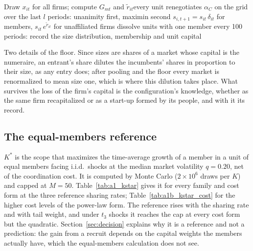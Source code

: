 \begin{algorithm}[H]
\caption{Order of events within a period}\label{alg:period}
\SetAlgoLined
Draw $x_{it}$ for all firms; compute $G_{mt}$ and $\tilde r_{it}$ every unit renegotiates $\alpha_C$ on the grid over the last $l$ periods: unanimity first, maximin second\;
$s_{i,t+1} = s_{it}\,\delta_{it}$ for members, $s_{it}\,e^{\tilde r_{it}}$ for unaffiliated firms\;
dissolve units with one member\;
every 100 periods: record the size distribution, membership and unit capital\;
\end{algorithm}

Two details of the floor. Since sizes are shares of a market whose capital is the numeraire, an entrant's share dilutes the incumbents' shares in proportion to their size, as any entry does; after pooling and the floor every market is renormalized to mean size one, which is where this dilution takes place. What survives the loss of the firm's capital is the configuration's knowledge, whether as the same firm recapitalized or as a start-up formed by its people, and with it its record.

\subsection{The equal-members reference}\label{app:kstar}

$K^*$ is the scope that maximizes the time-average growth of a member in a unit of equal members facing i.i.d.\ shocks at the median market volatility $q = 0.20$, net of the coordination cost. It is computed by Monte Carlo ($2 \times 10^6$ draws per $K$) and capped at $M = 50$. Table~\ref{tab:a1_kstar} gives it for every family and cost form at the three reference sharing rates; Table~\ref{tab:a1b_kstar_cost} for the higher cost levels of the power-law form. The reference rises with the sharing rate and with tail weight, and under $t_3$ shocks it reaches the cap at every cost form but the quadratic. Section~\ref{sec:decision} explains why it is a reference and not a prediction: the gain from a recruit depends on the capital weights the members actually have, which the equal-members calculation does not see.

